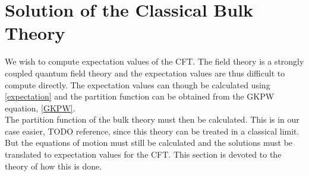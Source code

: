 \documentclass[12pt]{report}
\begin{document}
\chapter{Solution of the Classical Bulk Theory}
We wish to compute expectation values of the CFT. The field theory is a strongly coupled quantum field theory and the expectation values are thus difficult to compute directly. The expectation values can though be calculated using \eqref{expectation} and the partition function can be obtained from the GKPW equation, \eqref{GKPW}.\\

The partition function of the bulk theory must then be calculated. This is in our case easier, TODO reference, since this theory can be treated in a classical limit. But the equations of motion must still be calculated and the solutions must be translated to expectation values for the CFT. This section is devoted to the theory of how this is done.
\end{document}
